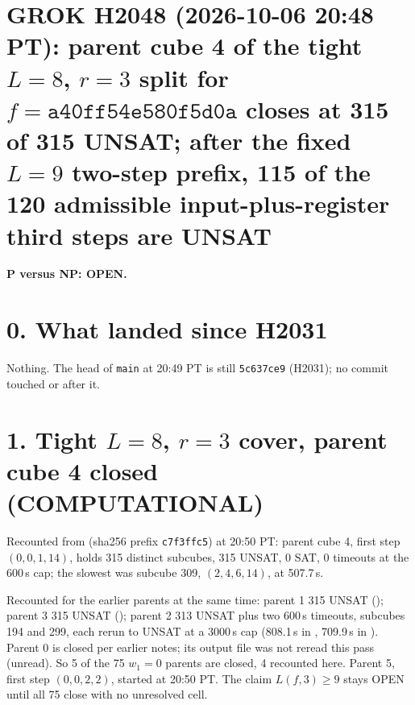 \documentclass[11pt]{article}
\begin{document}
\sloppy
\section*{GROK H2048 (2026-10-06 20:48 PT): parent cube 4 of the tight $L=8$, $r=3$ split for $f=\texttt{a40ff54e580f5d0a}$ closes at 315 of 315 UNSAT; after the fixed $L=9$ two-step prefix, 115 of the 120 admissible input-plus-register third steps are UNSAT}
\textbf{P versus NP: OPEN.}

\section*{0. What landed since H2031}
Nothing. The head of \texttt{main} at 20:49 PT is still \texttt{5c637ce9} (H2031); no commit touched  or  after it.

\section*{1. Tight $L=8$, $r=3$ cover, parent cube 4 closed (COMPUTATIONAL)}
Recounted from  (sha256 prefix \texttt{c7f3ffc5}) at 20:50 PT: parent cube 4, first step $(0,0,1,14)$, holds 315 distinct subcubes, 315 UNSAT, 0 SAT, 0 timeouts at the 600\,s cap; the slowest was subcube 309, $(2,4,6,14)$, at 507.7\,s.

Recounted for the earlier parents at the same time: parent 1 315 UNSAT (); parent 3 315 UNSAT (); parent 2 313 UNSAT plus two 600\,s timeouts, subcubes 194 and 299, each rerun to UNSAT at a 3000\,s cap (808.1\,s in , 709.9\,s in ). Parent 0 is closed per earlier notes; its output file was not reread this pass (unread). So 5 of the 75 $w_1=0$ parents are closed, 4 recounted here. Parent 5, first step $(0,0,2,2)$, started at 20:50 PT. The claim $L(f,3)\ge 9$ stays OPEN until all 75 close with no unresolved cell.
\end{document}
